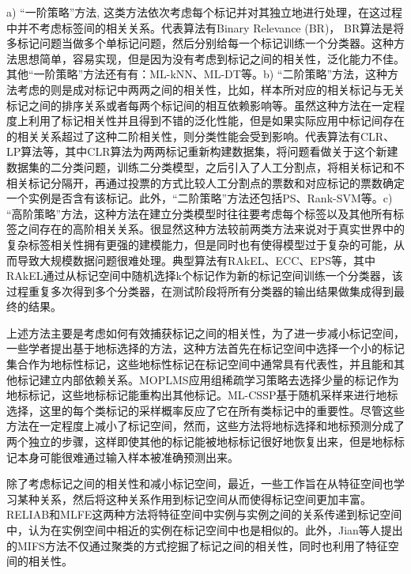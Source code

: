a) “一阶策略”方法, 这类方法依次考虑每个标记并对其独立地进行处理，在这过程中并不考虑标签间的相关关系。代表算法有Binary Relevance (BR)，
BR算法是将多标记问题当做多个单标记问题，然后分别给每一个标记训练一个分类器。这种方法思想简单，容易实现，但是因为没有考虑到标记之间的相关性，泛化能力不佳。其他“一阶策略”方法还有有：ML-kNN、ML-DT等。b) “二阶策略”方法，这种方法考虑的则是成对标记中两两之间的相关性，比如，样本所对应的相关标记与无关标记之间的排序关系或者每两个标记间的相互依赖影响等。虽然这种方法在一定程度上利用了标记相关性并且得到不错的泛化性能，但是如果实际应用中标记间存在的相关关系超过了这种二阶相关性，则分类性能会受到影响。代表算法有CLR\cite{Agrawal2013Multi}、LP算法等，其中CLR算法为两两标记重新构建数据集，将问题看做关于这个新建数据集的二分类问题，训练二分类模型，之后引入了人工分割点，将相关标记和不相关标记分隔开，再通过投票的方式比较人工分割点的票数和对应标记的票数确定一个实例是否含有该标记。此外，“二阶策略”方法还包括PS\cite{F2008Multilabel}、Rank-SVM等。c) “高阶策略”方法，这种方法在建立分类模型时往往要考虑每个标签以及其他所有标签之间存在的高阶相关关系。很显然这种方法较前两类方法来说对于真实世界中的复杂标签相关性拥有更强的建模能力，但是同时也有使得模型过于复杂的可能，从而导致大规模数据问题很难处理。典型算法有RAkEL\cite{Ge2018Multi}、ECC、EPS\cite{Read2008Multi}等，其中RAkEL通过从标记空间中随机选择k个标记作为新的标记空间训练一个分类器，该过程重复多次得到多个分类器，在测试阶段将所有分类器的输出结果做集成得到最终的结果。

上述方法主要是考虑如何有效捕获标记之间的相关性，为了进一步减小标记空间，一些学者提出基于地标选择的方法，这种方法首先在标记空间中选择一个小的标记集合作为地标性标记，这些地标性标记在标记空间中通常具有代表性，并且能和其他标记建立内部依赖关系。MOPLMS应用组稀疏学习策略去选择少量的标记作为地标标记，这些地标标记能重构出其他标记。ML-CSSP基于随机采样来进行地标选择，这里的每个类标记的采样概率反应了它在所有类标记中的重要性。尽管这些方法在一定程度上减小了标记空间，然而，这些方法将地标选择和地标预测分成了两个独立的步骤，这样即使其他的标记能被地标标记很好地恢复出来，但是地标标记本身可能很难通过输入样本被准确预测出来。

除了考虑标记之间的相关性和减小标记空间，最近，一些工作\cite{Li2015Leveraging}旨在从特征空间也学习某种关系，然后将这种关系作用到标记空间从而使得标记空间更加丰富。RELIAB\cite{Li2015Leveraging}和MLFE这两种方法将特征空间中实例与实例之间的关系传递到标记空间中，认为在实例空间中相近的实例在标记空间中也是相似的。此外，Jian等人提出的MIFS\cite{Jiang2016CNN}方法不仅通过聚类的方式挖掘了标记之间的相关性，同时也利用了特征空间的相关性。



